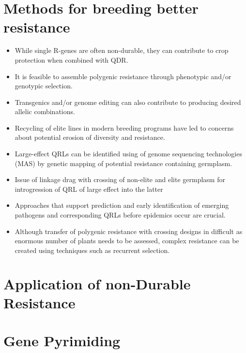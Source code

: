 \documentclass[11pt,dvipsnames,ignorenonframetext,aspectratio=169]{beamer}
\providecommand{\tightlist}{%
  \setlength{\itemsep}{0pt}\setlength{\parskip}{0pt}}
\begin{document}
\hypertarget{methods-for-breeding-better-resistance}{%
\section{Methods for breeding better
resistance}\label{methods-for-breeding-better-resistance}}

\begin{frame}{}
\protect\hypertarget{section-5}{}
\small

\begin{itemize}
\tightlist
\item
  While single R-genes are often non-durable, they can contribute to
  crop protection when combined with QDR.
\item
  It is feasible to assemble polygenic resistance through phenotypic
  and/or genotypic selection.
\item
  Transgenics and/or genome editing can also contribute to producing
  desired allelic combinations.
\item
  Recycling of elite lines in modern breeding programs have led to
  concerns about potential erosion of diversity and resistance.
\item
  Large-effect QRLs can be identified using of genome sequencing
  technologies (MAS) by genetic mapping of potential resistance
  containing germplasm.
\item
  Issue of linkage drag with crossing of non-elite and elite germplasm
  for introgression of QRL of large effect into the latter
\item
  Approaches that support prediction and early identification of
  emerging pathogens and corresponding QRLs before epidemics occur are
  crucial.
\item
  Although transfer of polygenic resistance with crossing designs in
  difficult as enormous number of plants needs to be assessed, complex
  resistance can be created using techniques such as recurrent
  selection.
\end{itemize}
\end{frame}

\hypertarget{application-of-non-durable-resistance}{%
\section{Application of non-Durable
Resistance}\label{application-of-non-durable-resistance}}

\hypertarget{gene-pyrimiding}{%
\section{Gene Pyrimiding}\label{gene-pyrimiding}}
\end{document}
